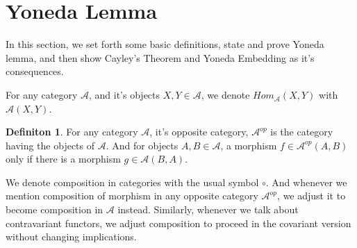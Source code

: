 \documentclass[18pt,a4paper]{article}
\theoremstyle{definition}
\newtheorem{definition}[theorem]{Definiton}
\begin{document}
\section{Yoneda Lemma} %
In this section, we set forth some basic definitions, state and prove Yoneda lemma, and then
show Cayley's Theorem and Yoneda Embedding as it's consequences.

For any category $\mathcal{A}$, and it's objects $X,Y\in \mathcal{A} $,
we denote $Hom_{\mathcal{A}}^{\mbox{}}(X,Y)$ with $\mathcal{A} (X,Y)$.

\begin{definition} %
For any category $\mathcal{A} $, it's opposite category, $\mathcal{A}^{op}$
is the category having the objects of $\mathcal{A}$.
And for objects $A,B \in \mathcal{A} $, a morphism $f \in \mathcal{A}^{op} (A,B)$
only if there is a morphism $g \in \mathcal{A}(B,A)$.
\end{definition}

We denote composition in categories with the usual symbol $\circ $. And whenever we mention composition
of morphism in any opposite category $\mathcal{A} ^{op}$, we adjust it to
become composition in $\mathcal{A}$ instead. Similarly, whenever we talk about contravariant
functors, we adjust composition to proceed in the covariant version without changing implications.
\end{document}
